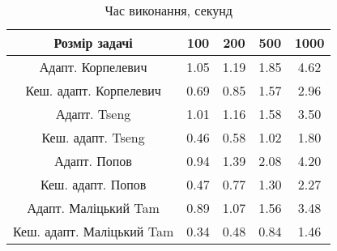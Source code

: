 \begin{table}[H]
	\centering
	\begin{tabular}{|c||c|c|c|c|}\hline
		Розмір задачі & 100 & 200 & 500 & 1000 \\ \hline \hline
		Адапт. Корпелевич & 1.05 & 1.19 & 1.85 & 4.62 \\ \hline
		Кеш. адапт. Корпелевич & 0.69 & 0.85 & 1.57 & 2.96 \\ \hline
		Адапт. Tseng & 1.01 & 1.16 & 1.58 & 3.50 \\ \hline
		Кеш. адапт. Tseng & 0.46 & 0.58 & 1.02 & 1.80 \\ \hline
		Адапт. Попов & 0.94 & 1.39 & 2.08 & 4.20 \\ \hline
		Кеш. адапт. Попов & 0.47 & 0.77 & 1.30 & 2.27 \\ \hline
		Адапт. Маліцький Tam & 0.89 & 1.07 & 1.56 & 3.48 \\ \hline
		Кеш. адапт. Маліцький Tam & 0.34 & 0.48 & 0.84 & 1.46 \\ \hline
	\end{tabular}
	\caption{Час виконання, секунд}
\end{table}
